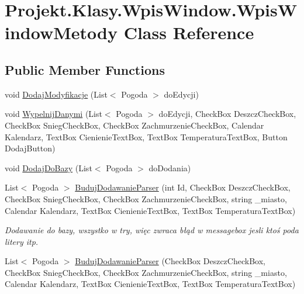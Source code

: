 \hypertarget{class_projekt_1_1_klasy_1_1_wpis_window_1_1_wpis_window_metody}{}\section{Projekt.\+Klasy.\+Wpis\+Window.\+Wpis\+Window\+Metody Class Reference}
\label{class_projekt_1_1_klasy_1_1_wpis_window_1_1_wpis_window_metody}
\subsection*{Public Member Functions}
\begin{DoxyCompactItemize}
\item 
void \mbox{\hyperlink{class_projekt_1_1_klasy_1_1_wpis_window_1_1_wpis_window_metody_a0bf2da932cdb7689e3f4cc5e1e0e0243}{Dodaj\+Modyfikacje}} (List$<$ Pogoda $>$ do\+Edycji)
\item 
void \mbox{\hyperlink{class_projekt_1_1_klasy_1_1_wpis_window_1_1_wpis_window_metody_a8d36f2b484338666ab870d6c0cfd3ba4}{Wypelnij\+Danymi}} (List$<$ Pogoda $>$ do\+Edycji, Check\+Box Deszcz\+Check\+Box, Check\+Box Snieg\+Check\+Box, Check\+Box Zachmurzenie\+Check\+Box, Calendar Kalendarz, Text\+Box Cienienie\+Text\+Box, Text\+Box Temperatura\+Text\+Box, Button Dodaj\+Button)
\item 
void \mbox{\hyperlink{class_projekt_1_1_klasy_1_1_wpis_window_1_1_wpis_window_metody_a011d0008b8ca845eff27f2b90629c17d}{Dodaj\+Do\+Bazy}} (List$<$ Pogoda $>$ do\+Dodania)
\item 
List$<$ Pogoda $>$ \mbox{\hyperlink{class_projekt_1_1_klasy_1_1_wpis_window_1_1_wpis_window_metody_a79fc019266feb11020642110c63c4402}{Buduj\+Dodawanie\+Parser}} (int Id, Check\+Box Deszcz\+Check\+Box, Check\+Box Snieg\+Check\+Box, Check\+Box Zachmurzenie\+Check\+Box, string \+\_\+miasto, Calendar Kalendarz, Text\+Box Cienienie\+Text\+Box, Text\+Box Temperatura\+Text\+Box)
\begin{DoxyCompactList}\small\item\em Dodawanie do bazy, wszystko w try, więc zwraca błąd w messagebox jesli ktoś poda litery itp. \end{DoxyCompactList}\item 
List$<$ Pogoda $>$ \mbox{\hyperlink{class_projekt_1_1_klasy_1_1_wpis_window_1_1_wpis_window_metody_a8860fc9dd75fb6aae85ee31f61eedf81}{Buduj\+Dodawanie\+Parser}} (Check\+Box Deszcz\+Check\+Box, Check\+Box Snieg\+Check\+Box, Check\+Box Zachmurzenie\+Check\+Box, string \+\_\+miasto, Calendar Kalendarz, Text\+Box Cienienie\+Text\+Box, Text\+Box Temperatura\+Text\+Box)
\end{DoxyCompactItemize}


